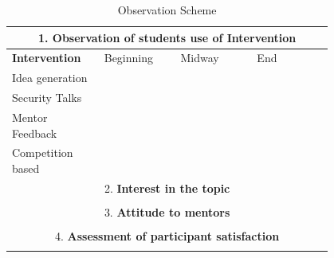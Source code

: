 \begin{table}[h]
    \begin{tabular}{|p{0.2\linewidth}|p{0.2\linewidth}|p{0.2\linewidth}|p{0.2\linewidth}|}
    \hline
   \multicolumn{4}{|c|}{1. \textbf{Observation of students use of Intervention}}\\ \hline
    \textbf{Intervention} & Beginning & Midway & End \\ \hline
    Idea generation & & & \\ \hline
    Security Talks & & & \\ \hline
    Mentor Feedback & & & \\ \hline
    Competition based & & & \\ \hline
    \multicolumn{4}{|c|}{2. \textbf{Interest in the topic }}\\ \hline
     \multicolumn{4}{|c|}{} \\ \hline
     \multicolumn{4}{|c|}{3. \textbf{Attitude to mentors }}\\ \hline
     \multicolumn{4}{|c|}{} \\ \hline
     \multicolumn{4}{|c|}{4. \textbf{Assessment of participant satisfaction }}\\ \hline
     \multicolumn{4}{|c|}{} \\ \hline
    \end{tabular}
    \caption{Observation Scheme}
    \label{tab:observescheme}
\end{table}




